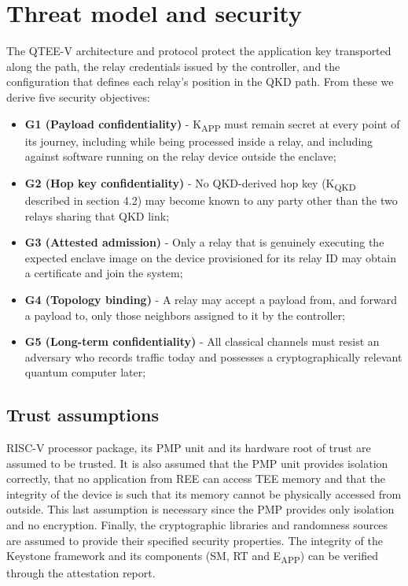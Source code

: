 \documentclass[futureinternet,article,submit,moreauthors]{Definitions/mdpi}
\begin{document}
\section{Threat model and security}\label{sec:threat_model}

The QTEE-V architecture and protocol protect the application key transported along the path, the relay credentials issued by the controller, and the configuration that defines each relay's position in the QKD path. From these we derive five security objectives:

\begin{itemize}[leftmargin=*,labelsep=5.8mm]
\item \textbf{G1 (Payload confidentiality)} - K\textsubscript{APP} must remain secret at every point of its journey, including while being processed inside a relay, and including against software running on the relay device outside the enclave;
\item \textbf{G2 (Hop key confidentiality)} - No QKD-derived hop key (K\textsubscript{QKD} described in section 4.2) may become known to any party other than the two relays sharing that QKD link;
\item \textbf{G3 (Attested admission)} - Only a relay that is genuinely executing the expected enclave image on the device provisioned for its relay ID may obtain a certificate and join the system;
\item \textbf{G4 (Topology binding)} - A relay may accept a payload from, and forward a payload to, only those neighbors assigned to it by the controller;
\item \textbf{G5 (Long-term confidentiality)} - All classical channels must resist an adversary who records traffic today and possesses a cryptographically relevant quantum computer later;
\end{itemize}

\subsection{Trust assumptions}

RISC-V processor package, its PMP unit and its hardware root of trust are assumed to be trusted. It is also assumed that the PMP unit provides isolation correctly, that no application from REE can access TEE memory and that the integrity of the device is such that its memory cannot be physically accessed from outside. This last assumption is necessary since the PMP provides only isolation and no encryption. Finally, the cryptographic libraries and randomness sources are assumed to provide their specified security properties. The integrity of the Keystone framework and its components (SM, RT and E\textsubscript{APP}) can be verified through the attestation report.
\end{document}
